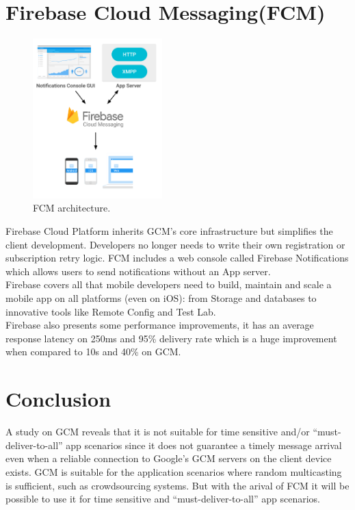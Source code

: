 \section{Firebase Cloud Messaging(FCM)}
\begin{figure}[!htb]
\centering
\includegraphics[width=5cm]{images/fcm.png}
\caption{\label{fig:fcm}FCM architecture.}
\end{figure}
Firebase Cloud Platform inherits GCM’s core infrastructure but simplifies the client development. Developers no longer needs to write their own registration or subscription retry logic. FCM includes a web console called Firebase Notifications which allows users to send notifications without an App server.\\
Firebase covers all that mobile developers need to build, maintain and scale a mobile app on all platforms (even on iOS): from Storage and databases to innovative tools like Remote Config and Test Lab.\\
Firebase also presents some performance improvements, it has an average response latency on 250ms and  95\% delivery rate which is a huge improvement when compared to 10s and 40\% on GCM.
\section{Conclusion}
A study on GCM reveals that it is not suitable for time sensitive and/or “must-deliver-to-all” app
scenarios since it does not guarantee a timely message arrival even when a reliable
connection to Google’s GCM servers on the client device exists. GCM is suitable for the application scenarios
where random multicasting is sufficient, such as crowdsourcing
systems. But with the arival of FCM it will be possible to use it for time sensitive and “must-deliver-to-all” app
scenarios.   


